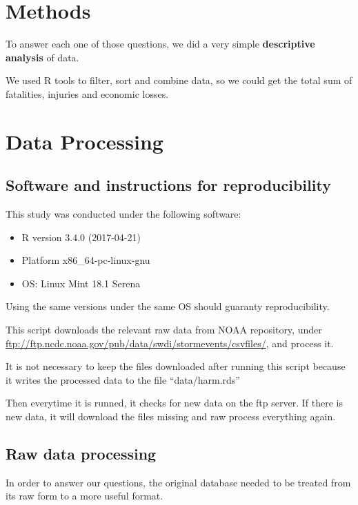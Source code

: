 \documentclass[]{article}
\providecommand{\tightlist}{%
  \setlength{\itemsep}{0pt}\setlength{\parskip}{0pt}}
\begin{document}
\section{Methods}\label{methods}

To answer each one of those questions, we did a very simple
\textbf{descriptive analysis} of data.

We used R tools to filter, sort and combine data, so we could get the
total sum of fatalities, injuries and economic losses.

\section{Data Processing}\label{data-processing}

\subsection{Software and instructions for
reproducibility}\label{software-and-instructions-for-reproducibility}

This study was conducted under the following software:

\begin{itemize}
\tightlist
\item
  R version 3.4.0 (2017-04-21)
\item
  Platform x86\_64-pc-linux-gnu
\item
  OS: Linux Mint 18.1 Serena
\end{itemize}

Using the same versions under the same OS should guaranty
reproducibility.

This script downloads the relevant raw data from NOAA repository, under
\url{ftp://ftp.ncdc.noaa.gov/pub/data/swdi/stormevents/csvfiles/}, and
process it.

It is not necessary to keep the files downloaded after running this
script because it writes the processed data to the file
``data/harm.rds''

Then everytime it is runned, it checks for new data on the ftp server.
If there is new data, it will download the files missing and raw process
everything again.

\subsection{Raw data processing}\label{raw-data-processing}

In order to answer our questions, the original database needed to be
treated from its raw form to a more useful format.
\end{document}
